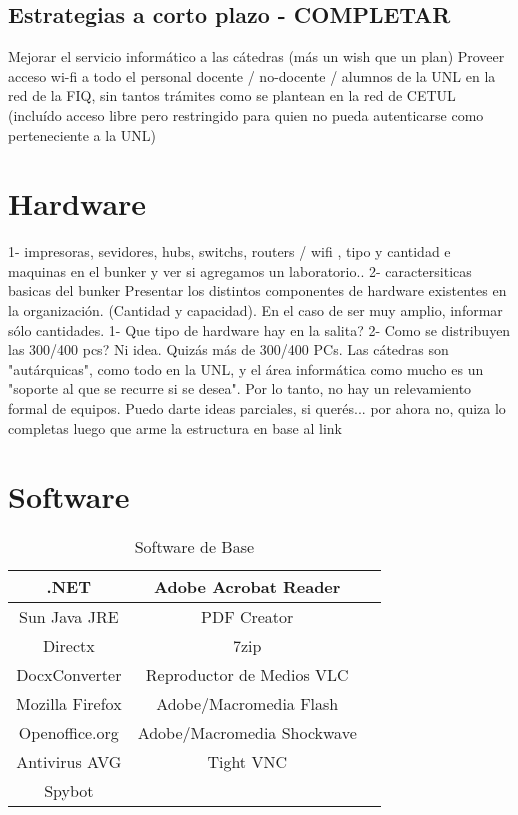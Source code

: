 \documentclass[10pt,a4paper,final]{article}
\begin{document}
\subsection{Estrategias a corto plazo - COMPLETAR}
Mejorar el servicio informático a las cátedras (más un wish que un plan)
Proveer acceso wi-fi a todo el personal docente / no-docente / alumnos de la UNL en la red de la FIQ, sin tantos trámites como se plantean en la red de CETUL (incluído acceso libre pero restringido para quien no pueda autenticarse como perteneciente a la UNL)

\section{Hardware}
1- impresoras, sevidores, hubs, switchs, routers / wifi , tipo y cantidad e maquinas en el bunker y ver si agregamos un laboratorio..
2- caractersiticas basicas del bunker
Presentar los distintos componentes de hardware existentes en la organización. (Cantidad y capacidad).
En el caso de ser muy amplio, informar sólo cantidades.
1- Que tipo de hardware hay en la salita?
2- Como se distribuyen las 300/400 pcs?
Ni idea. Quizás más de 300/400 PCs. Las cátedras son "autárquicas", como todo en la UNL, y el área informática como mucho es un "soporte al que se recurre si se desea". Por lo tanto, no hay un relevamiento formal de equipos.
Puedo darte ideas parciales, si querés...
por ahora no, quiza lo completas luego que arme la estructura en base al link

\section{Software}

\begin{table}
\caption{Software de Base}
\begin{center}\begin{tabular}{ccc}
\hline .NET & Adobe Acrobat Reader\\
\hline Sun Java JRE & PDF Creator\\
\hline Directx & 7zip\\
\hline DocxConverter & Reproductor de Medios VLC\\
\hline Mozilla Firefox & Adobe/Macromedia Flash\\
\hline Openoffice.org & Adobe/Macromedia Shockwave\\
\hline Antivirus AVG & Tight VNC\\
\hline Spybot & \\
\hline
\end{tabular}\end{center}
\label{tablaerrores}
\end{table}
\end{document}
